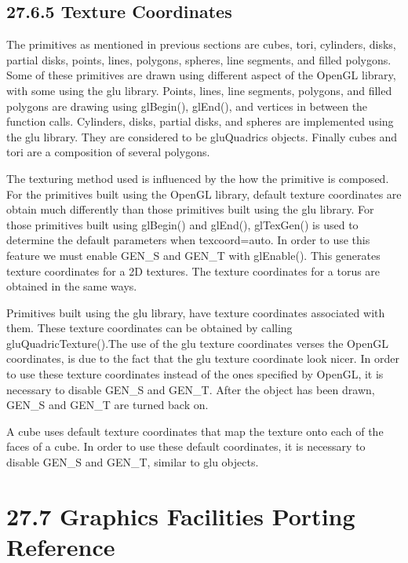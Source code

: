 \subsection[27.6.5 Texture Coordinates]{27.6.5 Texture Coordinates}

The primitives as mentioned in previous sections are cubes, tori,
cylinders, disks, partial disks, points, lines, polygons, spheres,
line segments, and filled polygons. Some of these primitives are drawn
using different aspect of the OpenGL library, with some using the glu
library. Points, lines, line segments, polygons, and filled polygons
are drawing using \textsf{glBegin()}, \textsf{glEnd()}, and vertices
in between the function calls. Cylinders, disks, partial disks, and
spheres are implemented using the glu library. They are considered to
be\textsf{ gluQuadrics} objects. Finally cubes and tori are a
composition of several polygons.

The texturing method used is influenced by the how the primitive is
composed. For the primitives built using the OpenGL library, default
texture coordinates are obtain much differently than those primitives
built using the glu library. For those primitives built using
\textsf{glBegin()} and \textsf{glEnd()}, \textsf{glTexGen()} is used
to determine the default parameters when
\textsf{{\textquotedbl}texcoord=auto{\textquotedbl}}. In order to use
this feature we must enable \textsf{GEN\_S} and \textsf{GEN\_T} with
\textsf{glEnable().} This generates texture coordinates for a 2D
textures. The texture coordinates for a torus are obtained in the same
ways.

Primitives built using the glu library, have texture coordinates
associated with them. These texture coordinates can be obtained by
calling \textsf{gluQuadricTexture()}.The use of the glu texture
coordinates verses the OpenGL coordinates, is due to the fact that the
glu texture coordinate look nicer. In order to use these texture
coordinates instead of the ones specified by OpenGL, it is necessary
to disable \textsf{GEN\_S} and \textsf{GEN\_T}. After the object has
been drawn, \textsf{GEN\_S} and \textsf{GEN\_T} are turned back on.

A cube uses default texture coordinates that map the texture onto each
of the faces of a cube. In order to use these default coordinates, it
is necessary to disable \textsf{GEN\_S} and \textsf{GEN\_T}, similar
to glu objects.

\section[27.7 Graphics Facilities Porting Reference]{27.7 Graphics Facilities Porting Reference}

